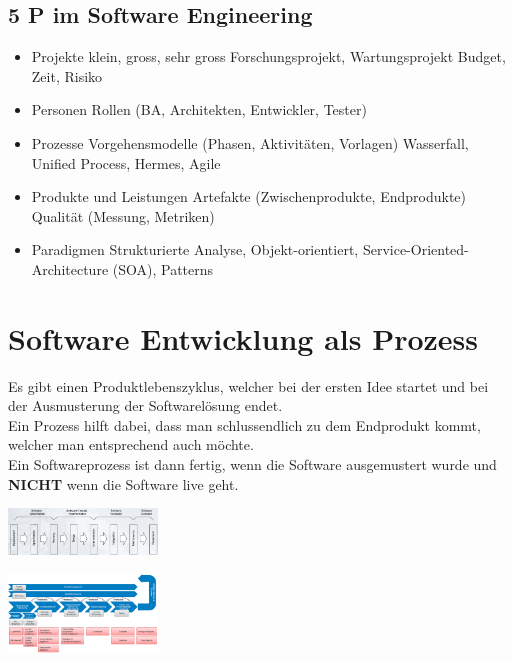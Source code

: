 \documentclass{report}
\newenvironment{Figure}
	{\par\medskip\noindent\minipage{\linewidth}}
	{\endminipage\par\medskip}
\theoremstyle{definition}
\theoremstyle{example}
\begin{document}
\subsection{5 P im Software Engineering}
\begin{itemize}
   \item Projekte
   \subitem klein, gross, sehr gross
   \subitem Forschungsprojekt, Wartungsprojekt
   \subitem Budget, Zeit, Risiko 
   \item Personen
   \subitem Rollen (BA, Architekten, Entwickler, Tester)
   \item Prozesse
   \subitem Vorgehensmodelle (Phasen, Aktivitäten, Vorlagen)
   \subitem Wasserfall, Unified Process, Hermes, Agile
   \item Produkte und Leistungen
   \subitem Artefakte (Zwischenprodukte, Endprodukte)
   \subitem Qualität (Messung, Metriken)
   \item Paradigmen
   \subitem Strukturierte Analyse, Objekt-orientiert, Service-Oriented-Architecture (SOA), Patterns
\end{itemize}

\section{Software Entwicklung als Prozess}
Es gibt einen Produktlebenszyklus, welcher bei der ersten Idee startet und bei der Ausmusterung der Softwarelösung endet.\\
Ein Prozess hilft dabei, dass man schlussendlich zu dem Endprodukt kommt, welcher man entsprechend auch möchte.\\
Ein Softwareprozess ist dann fertig, wenn die Software ausgemustert wurde und \textbf{NICHT} wenn die Software live geht.

\begin{Figure}
   \centering
    \includegraphics[width=150px]{img/SoftwareLifeCycle.png}
        \label{fig:Software Lifecycle}
\end{Figure}

\begin{Figure}
   \centering
    \includegraphics[width=150px]{img/SERoles.png}
        \label{fig:Software Engineering Prozessueberblick}
\end{Figure}
\end{document}
